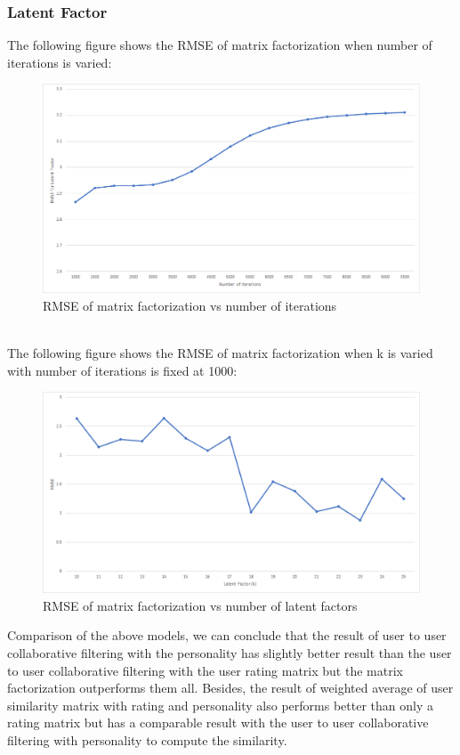 \subsubsection{Latent Factor}
The following figure shows the RMSE of matrix factorization when number of iterations is varied:
\begin{figure}[!ht]
\centering
\includegraphics[width = \textwidth ]{fig/rmse_step.png}
\caption{RMSE of matrix factorization vs number of iterations}
\label{fig:rmse_step}
\end{figure}
\\
The following figure shows the RMSE of matrix factorization when k is varied with number of iterations is fixed at 1000:
\begin{figure}[!ht]
\centering
\includegraphics[width = \textwidth ]{fig/rmse_k.png}
\caption{RMSE of matrix factorization vs number of latent factors}
\label{fig:rmse_k}
\end{figure}

Comparison of the above models, we can conclude that the result of user to user collaborative filtering with the personality has slightly better result than the user to user collaborative filtering with the user rating matrix but the matrix factorization outperforms them all. Besides, the result of weighted average of user similarity matrix with rating and personality also performs better than only a rating matrix but has a comparable result with the user to user collaborative filtering with personality to compute the similarity.